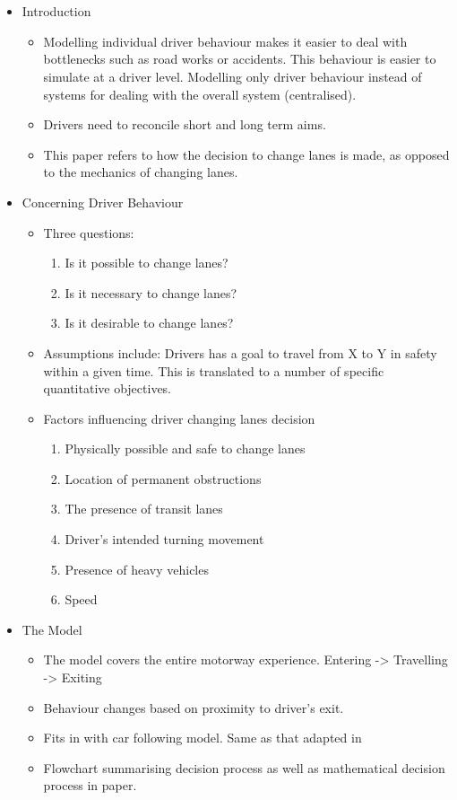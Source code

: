 \section{}
\label{sec:Gipps1986}
\begin{itemize}
\item Introduction
\begin{itemize}
\item Modelling individual driver behaviour makes it easier to deal with bottlenecks such as road works or accidents. This behaviour is easier to simulate at a driver level. Modelling only driver behaviour instead of systems for dealing with the overall system (centralised).
\item Drivers need to reconcile short and long term aims.
\item This paper refers to how the decision to change lanes is made, as opposed to the mechanics of changing lanes.
\end{itemize}
\item Concerning Driver Behaviour
\begin{itemize}
\item Three questions:
\begin{enumerate}
\item Is it possible to change lanes?
\item Is it necessary to change lanes?
\item Is it desirable to change lanes?
\end{enumerate}
\item Assumptions include: Drivers has a goal to travel from X to Y in safety within a given time. This is translated to a number of specific quantitative objectives.
\item Factors influencing driver changing lanes decision
\begin{enumerate}
\item Physically possible and safe to change lanes
\item Location of permanent obstructions
\item The presence of transit lanes
\item Driver's intended turning movement
\item Presence of heavy vehicles
\item Speed
\end{enumerate}
\end{itemize}
\item The Model
\begin{itemize}
\item The model covers the entire motorway experience. Entering -> Travelling -> Exiting
\item Behaviour changes based on proximity to driver's exit.
\item Fits in with car following model. Same as that adapted in \citet{Kesting2007}
\item Flowchart summarising decision process as well as mathematical decision process in paper.
\end{itemize}
\end{itemize}